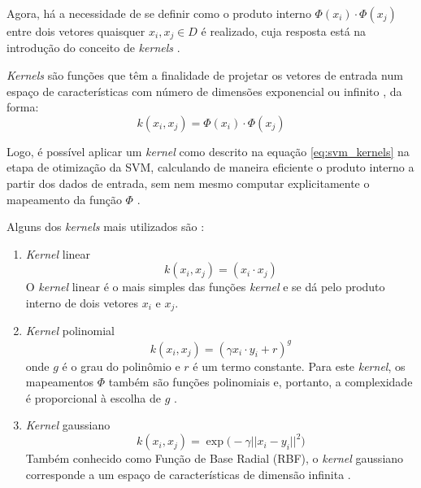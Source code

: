 Agora, há a necessidade de se definir como o produto interno $\Phi(x_i)\cdot \Phi(x_j)$ entre dois vetores quaisquer $x_i, x_j \in D$ é realizado, cuja resposta está na introdução do conceito de \emph{kernels} \citep{lorena:03}.

\emph{Kernels} são funções que têm a finalidade de projetar os vetores de entrada num espaço de características com número de dimensões exponencial ou infinito \citep{taylor:04}, da forma:
\begin{equation}
\label{eq:svm_kernels}
k(x_i, x_j) =  \Phi(x_i) \cdot \Phi(x_j)
\end{equation}

Logo, é possível aplicar um \emph{kernel} como descrito na equação \ref{eq:svm_kernels} na etapa de otimização da SVM, calculando de maneira eficiente o produto interno a partir dos dados de entrada, sem nem mesmo computar explicitamente o mapeamento da função $\Phi$ \citep{taylor:04}.

Alguns dos \emph{kernels} mais utilizados são \citep{lorena:03}:
\begin{enumerate}[label=(\roman*)]
\item \emph{Kernel} linear
\begin{equation}
\label{eq:svm_kernel_linear}
k(x_i, x_j) =  (x_i \cdot x_j)
\end{equation}
O \emph{kernel} linear é o mais simples das funções \emph{kernel} e se dá pelo produto interno de dois vetores $x_i$ e $x_j$.

\item \emph{Kernel} polinomial
\begin{equation}
\label{eq:svm_kernel_polinomial}
k(x_i, x_j) =  ({\gamma x_i \cdot y_i + r} )^g
\end{equation}
\noindent onde $g$ é o grau do polinômio e $r$ é um termo constante. Para este \emph{kernel}, os mapeamentos $\Phi$ também são funções polinomiais e, portanto, a complexidade é proporcional à escolha de $g$ \citep{lorena:03}.

\item \emph{Kernel} gaussiano
\begin{equation}
\label{eq:svm_kernel_rbf}
k(x_i, x_j) =  \exp{\big(-\gamma {||x_i - y_i||}^2 \big)}
\end{equation}
Também conhecido como Função de Base Radial (RBF), o \emph{kernel} gaussiano corresponde a um espaço de características de dimensão infinita \citep{lorena:03}.
\end{enumerate}


